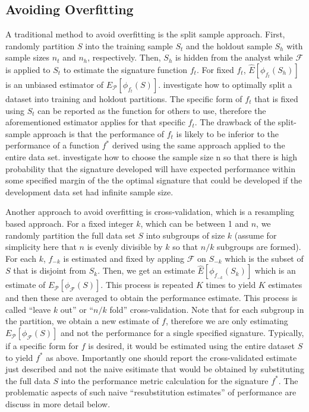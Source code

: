 \documentclass[11pt,]{article}
\begin{document}
\subsection{Avoiding Overfitting}\label{avoiding-overfitting}

A traditional method to avoid overfitting is the split sample approach.
First, randomly partition \(S\) into the training sample \(S_t\) and the
holdout sample \(S_h\) with sample sizes \(n_t\) and \(n_h\),
respectively. Then, \(S_h\) is hidden from the analyst while
\(\mathcal{F}\) is applied to \(S_t\) to estimate the signature function
\(f_t\). For fixed \(f_t\), \(\hat{E}[\phi_{f_t}(S_h)]\) is an unbiased
estimator of \(E_{\mathcal{P}}[\phi_{f_t}(S)]\).
\citet{dobbin2011optimally} investigate how to optimally split a dataset
into training and holdout partitions. The specific form of \(f_t\) that
is fixed using \(S_t\) can be reported as the function for others to
use, therefore the aforementioned estimator applies for that specific
\(f_t\). The drawback of the split-sample approach is that the
performance of \(f_t\) is likely to be inferior to the performance of a
function \(f^*\) derived using the same approach applied to the entire
data set. \citet{dobbin2007sample} investigate how to choose the sample
size n so that there is high probability that the signature developed
will have expected performance within some specified margin of the the
optimal signature that could be developed if the development data set
had infinite sample size.

Another approach to avoid overfitting is cross-validation, which is a
resampling based approach. For a fixed integer \(k\), which can be
between 1 and \(n\), we randomly partition the full data set \(S\) into
subgroups of size \(k\) (assume for simplicity here that \(n\) is evenly
divisible by \(k\) so that \(n/k\) subgroups are formed). For each
\(k\), \(f_{-k}\) is estimated and fixed by appling \(\mathcal{F}\) on
\(S_{-k}\) which is the subset of \(S\) that is disjoint from \(S_k\).
Then, we get an estimate \(\hat{E}[\phi_{f_{-k}}(S_k)]\) which is an
estimate of \(E_{\mathcal{P}}[\phi_{\mathcal{F}}(S)]\). This process is
repeated \(K\) times to yield \(K\) estimates and then these are
averaged to obtain the performance estimate. This process is called
``leave \(k\) out'' or ``\(n/k\) fold'' cross-validation. Note that for
each subgroup in the partition, we obtain a new estimate of \(f\),
therefore we are only estimating
\(E_{\mathcal{P}}[\phi_{\mathcal{F}}(S)]\) and not the performance for a
single specified signature. Typically, if a specific form for \(f\) is
desired, it would be estimated using the entire dataset \(S\) to yield
\(f^*\) as above. Importantly one should report the cross-validated
estimate just described and not the naive esitimate that would be
obtained by substituting the full data \(S\) into the performance metric
calculation for the signature \(f^*\). The problematic aspects of such
naive ``resubstitution estimates'' of performance are discuss in more
detail below.
\end{document}
